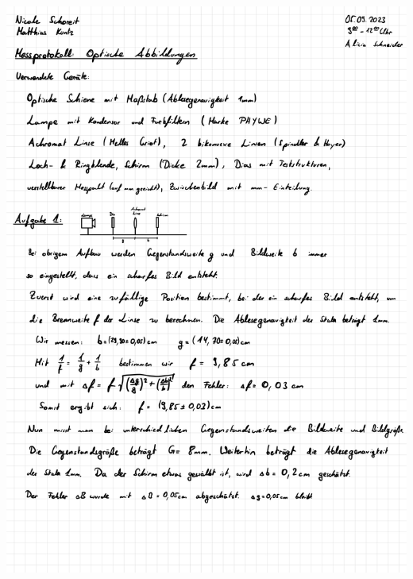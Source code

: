 \documentclass{article}
\begin{document}
\includegraphics[width=\textwidth]{graphics/mess1.jpg}
\newpage
\end{document}
